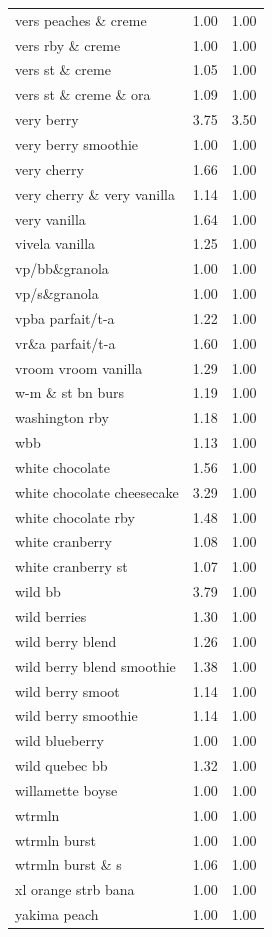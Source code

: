 \begin{table}
\begin{tabular}{lrr}
vers peaches \& creme & 1.00 & 1.00 \\
vers rby \& creme & 1.00 & 1.00 \\
vers st \& creme & 1.05 & 1.00 \\
vers st \& creme \& ora & 1.09 & 1.00 \\
very berry & 3.75 & 3.50 \\
very berry smoothie & 1.00 & 1.00 \\
very cherry & 1.66 & 1.00 \\
very cherry \& very vanilla & 1.14 & 1.00 \\
very vanilla & 1.64 & 1.00 \\
vivela vanilla & 1.25 & 1.00 \\
vp/bb\&granola & 1.00 & 1.00 \\
vp/s\&granola & 1.00 & 1.00 \\
vpba parfait/t-a & 1.22 & 1.00 \\
vr\&a parfait/t-a & 1.60 & 1.00 \\
vroom vroom vanilla & 1.29 & 1.00 \\
w-m \& st bn burs & 1.19 & 1.00 \\
washington rby & 1.18 & 1.00 \\
wbb & 1.13 & 1.00 \\
white chocolate & 1.56 & 1.00 \\
white chocolate cheesecake & 3.29 & 1.00 \\
white chocolate rby & 1.48 & 1.00 \\
white cranberry & 1.08 & 1.00 \\
white cranberry st & 1.07 & 1.00 \\
wild bb & 3.79 & 1.00 \\
wild berries & 1.30 & 1.00 \\
wild berry blend & 1.26 & 1.00 \\
wild berry blend smoothie & 1.38 & 1.00 \\
wild berry smoot & 1.14 & 1.00 \\
wild berry smoothie & 1.14 & 1.00 \\
wild blueberry & 1.00 & 1.00 \\
wild quebec bb & 1.32 & 1.00 \\
willamette boyse & 1.00 & 1.00 \\
wtrmln & 1.00 & 1.00 \\
wtrmln burst & 1.00 & 1.00 \\
wtrmln burst \& s & 1.06 & 1.00 \\
xl orange strb bana & 1.00 & 1.00 \\
yakima peach & 1.00 & 1.00 \\
\bottomrule
\end{tabular}
\end{table}
